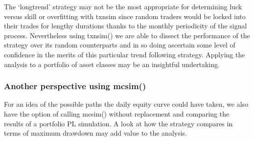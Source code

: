 The `longtrend' strategy may not be the most appropriate for determining
luck versus skill or overfitting with txnsim since random traders would
be locked into their trades for lengthy durations thanks to the monthly
periodicity of the signal process. Nevertheless using txnsim() we are
able to dissect the performance of the strategy over its random
counterparts and in so doing ascertain some level of confidence in the
merits of this particular trend following strategy. Applying the
analysis to a portfolio of asset classes may be an insightful
undertaking.

\hypertarget{another-perspective-using-mcsim}{%
\subsubsection{Another perspective using
mcsim()}\label{another-perspective-using-mcsim}}

For an idea of the possible paths the daily equity curve could have
taken, we also have the option of calling mcsim() without replacement
and comparing the results of a portfolio PL simulation. A look at how
the strategy compares in terms of maximum drawdown may add value to the
analysis.

